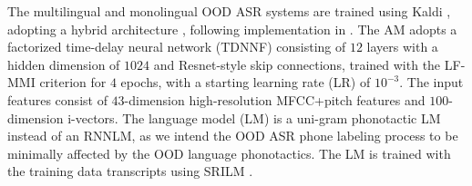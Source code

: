\documentclass[a4paper]{article}
\begin{document}
The multilingual and monolingual OOD ASR systems are trained using Kaldi \cite{povey2011kaldi}, adopting a hybrid  architecture \cite{dahl2011context}, following implementation   in \cite{feng2021how}. The AM adopts a factorized time-delay neural network (TDNNF) consisting of $12$ layers with a hidden dimension of $1024$
and Resnet-style skip connections, trained with the LF-MMI criterion \cite{povey2016purely} for $4$ epochs, with a starting learning rate (LR) of $10^{-3}$. The input features consist of $43$-dimension high-resolution MFCC+pitch features and $100$-dimension i-vectors. The language model (LM) is a uni-gram phonotactic LM instead of an RNNLM, as we intend the OOD ASR phone labeling process to be  minimally affected by the OOD language phonotactics. The LM is trained with the training data transcripts using SRILM \cite{Stolcke02srilm--}.

\end{document}
